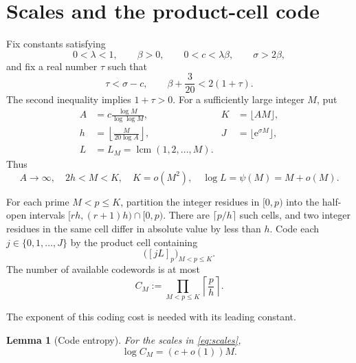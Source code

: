 \documentclass[11pt]{article}
\newtheorem{lemma}[theorem]{Lemma}
\theoremstyle{remark}
\newcommand{\e}{\mathrm e}
\DeclareMathOperator{\lcm}{lcm}
\begin{document}
\section{Scales and the product-cell code}\label{sec:scales}

Fix constants satisfying
\begin{equation}\label{eq:param-basic}
 0<\lambda<1,\qquad \beta>0,\qquad
 0<c<\lambda\beta,\qquad \sigma>2\beta,
\end{equation}
and fix a real number \(\tau\) such that
\begin{equation}\label{eq:param-tau}
 \tau<\sigma-c,
 \qquad
 \beta+\frac3{20}<2(1+\tau).
\end{equation}
The second inequality implies \(1+\tau>0\).  For a sufficiently large
integer \(M\), put
\begin{equation}\label{eq:scales}
 \begin{aligned}
 A&=c\frac{\log M}{\log\log M},
 &K&=\lfloor AM\rfloor,\\
 h&=\left\lfloor\frac{M}{20\log A}\right\rfloor,
 &J&=\lfloor\e^{\sigma M}\rfloor,\\
 L&=L_M=\lcm(1,2,\ldots,M).
 \end{aligned}
\end{equation}
Thus
\begin{equation}\label{eq:scale-facts}
 A\to\infty,\quad 2h<M<K,\quad K=o(M^2),\quad
 \log L=\psi(M)=M+o(M).
\end{equation}

For each prime \(M<p\leq K\), partition the integer residues in
\([0,p)\) into the half-open intervals
\([rh,(r+1)h)\cap[0,p)\).  There are
\(\lceil p/h\rceil\) such cells, and two integer residues in the same cell
differ in absolute value by less than \(h\).  Code each
\(j\in\{0,1,\ldots,J\}\) by the product cell containing
\begin{equation}\label{eq:code}
 \bigl([jL]_p\bigr)_{M<p\leq K}.
\end{equation}
The number of available codewords is at most
\begin{equation}\label{eq:def-CM}
 C_M:=\prod_{M<p\leq K}\left\lceil\frac ph\right\rceil.
\end{equation}

The exponent of this coding cost is needed with its leading constant.

\begin{lemma}[Code entropy]\label{lem:entropy}
For the scales in \eqref{eq:scales},
\begin{equation}\label{eq:entropy}
 \log C_M=(c+o(1))M.
\end{equation}
\end{lemma}
\end{document}
